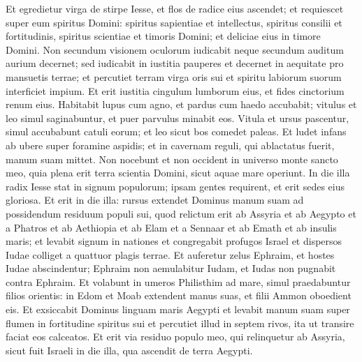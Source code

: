 \begin{biblechapter}
\begin{biblechapter}
\begin{biblechapter}
\begin{biblechapter}
\begin{biblechapter}
\begin{biblechapter}
\begin{biblechapter}
\begin{biblechapter}
\begin{biblechapter}
\begin{biblechapter}
\begin{biblechapter}
\verse Et egredietur virga de stirpe Iesse,
 et flos de radice eius ascendet;
 \verse et requiescet super eum spiritus Domini:
 spiritus sapientiae et intellectus,
 spiritus consilii et fortitudinis,
 spiritus scientiae et timoris Domini;
 \verse et deliciae eius in timore Domini.
 Non secundum visionem oculorum iudicabit
 neque secundum auditum aurium decernet;
 \verse sed iudicabit in iustitia pauperes
 et decernet in aequitate pro mansuetis terrae;
 et percutiet terram virga oris sui
 et spiritu labiorum suorum interficiet impium.
 \verse Et erit iustitia cingulum lumborum eius,
 et fides cinctorium renum eius.
 \verse Habitabit lupus cum agno,
 et pardus cum haedo accubabit;
 vitulus et leo simul saginabuntur,
 et puer parvulus minabit eos.
 \verse Vitula et ursus pascentur,
 simul accubabunt catuli eorum;
 et leo sicut bos comedet paleas.
 \verse Et ludet infans ab ubere
 super foramine aspidis;
 et in cavernam reguli,
 qui ablactatus fuerit, manum suam mittet.
 \verse Non nocebunt et non occident
 in universo monte sancto meo,
 quia plena erit terra scientia Domini, sicut aquae mare operiunt.
 \verse In die illa radix Iesse
 stat in signum populorum;
 ipsam gentes requirent,
 et erit sedes eius gloriosa.
 \verse Et erit in die illa: rursus extendet Dominus manum suam
 ad possidendum residuum populi sui,
 quod relictum erit ab Assyria et ab Aegypto
 et a Phatros et ab Aethiopia
 et ab Elam et a Sennaar
 et ab Emath et ab insulis maris;
 \verse et levabit signum in nationes
 et congregabit profugos Israel
 et dispersos Iudae colliget a quattuor plagis terrae.
 \verse Et auferetur zelus Ephraim,
 et hostes Iudae abscindentur;
 Ephraim non aemulabitur Iudam, et Iudas non pugnabit contra Ephraim.
 \verse Et volabunt in umeros Philisthim ad mare,
 simul praedabuntur filios orientis:
 in Edom et Moab extendent manus suas,
 et filii Ammon oboedient eis.
 \verse Et exsiccabit Dominus linguam maris Aegypti
 et levabit manum suam super flumen in fortitudine spiritus sui
 et percutiet illud in septem rivos,
 ita ut transire faciat eos calceatos.
 \verse Et erit via residuo populo meo,
 qui relinquetur ab Assyria,
 sicut fuit Israeli in die illa,
 qua ascendit de terra Aegypti.
 

\end{biblechapter}
\end{biblechapter}
\end{biblechapter}
\end{biblechapter}
\end{biblechapter}
\end{biblechapter}
\end{biblechapter}
\end{biblechapter}
\end{biblechapter}
\end{biblechapter}
\end{biblechapter}

